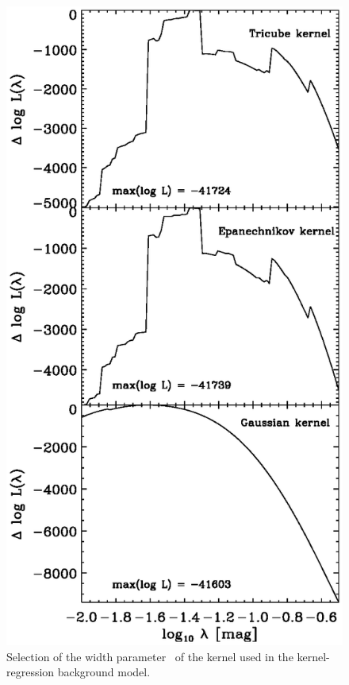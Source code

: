 \clearpage
\begin{figure}
\begin{center}
\includegraphics{figs_groups/loo_back_log.ps}
\end{center}
\caption[Selection of the width parameter \ of the kernel
  used in the kernel-regression background model]{Selection of the
  width parameter \ of the kernel used in the
  kernel-regression background model.}\label{fig:kernelwidthselection}
\end{figure}

